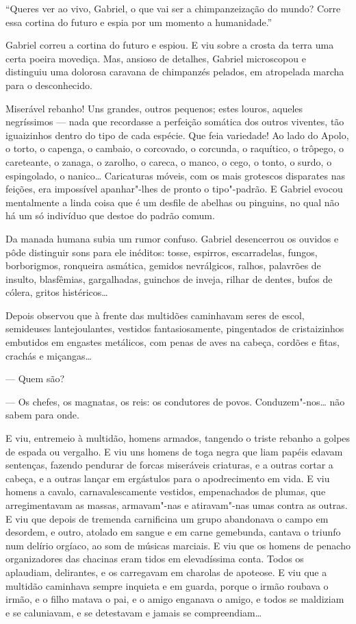 ``Queres ver ao vivo, Gabriel, o que vai ser a chimpanzeização do mundo?
Corre essa cortina do futuro e espia por um momento a humanidade.''

Gabriel correu a cortina do futuro e espiou. E viu sobre a crosta da
terra uma certa poeira movediça. Mas, ansioso de detalhes, Gabriel
microscopou e distinguiu uma dolorosa caravana de chimpanzés pelados, em
atropelada marcha para o desconhecido.

Miserável rebanho! Uns grandes, outros pequenos; estes louros, aqueles
negríssimos --- nada que recordasse a perfeição somática dos outros
viventes, tão iguaizinhos dentro do tipo de cada espécie. Que feia
variedade! Ao lado do Apolo, o torto, o capenga, o cambaio, o corcovado,
o corcunda, o raquítico, o trôpego, o careteante, o zanaga, o zarolho, o
careca, o manco, o cego, o tonto, o surdo, o espingolado, o nanico\ldots{}
Caricaturas móveis, com os mais grotescos disparates nas feições, era
impossível apanhar"-lhes de pronto o tipo"-padrão. E Gabriel evocou
mentalmente a linda coisa que é um desfile de abelhas ou pinguins, no
qual não há um só indivíduo que destoe do padrão comum.

Da manada humana subia um rumor confuso. Gabriel desencerrou os ouvidos
e pôde distinguir sons para ele inéditos: tosse, espirros, escarradelas,
fungos, borborigmos, ronqueira asmática, gemidos nevrálgicos, ralhos,
palavrões de insulto, blasfêmias, gargalhadas, guinchos de inveja,
rilhar de dentes, bufos de cólera, gritos histéricos\ldots{}

Depois observou que à frente das multidões caminhavam seres de escol,
semideuses lantejoulantes, vestidos fantasiosamente, pingentados de
cristaizinhos embutidos em engastes metálicos, com penas de aves na
cabeça, cordões e fitas, crachás e miçangas\ldots{}

--- Quem são?

--- Os chefes, os magnatas, os reis: os condutores de povos.
Conduzem"-nos\ldots{} não sabem para onde.

E viu, entremeio à multidão, homens armados, tangendo o triste rebanho a
golpes de espada ou vergalho. E viu uns homens de toga negra que liam
papéis edavam sentenças, fazendo pendurar de forcas miseráveis
criaturas, e a outras cortar a cabeça, e a outras lançar em ergástulos
para o apodrecimento em vida. E viu homens a cavalo, carnavalescamente
vestidos, empenachados de plumas, que arregimentavam as massas,
armavam"-nas e atiravam"-nas umas contra as outras. E viu que depois de
tremenda carnificina um grupo abandonava o campo em desordem, e outro,
atolado em sangue e em carne gemebunda, cantava o triunfo num delírio
orgíaco, ao som de músicas marciais. E viu que os homens de penacho
organizadores das chacinas eram tidos em elevadíssima conta. Todos os
aplaudiam, delirantes, e os carregavam em charolas de apoteose. E viu
que a multidão caminhava sempre inquieta e em guarda, porque o irmão
roubava o irmão, e o filho matava o pai, e o amigo enganava o amigo, e
todos se maldiziam e se caluniavam, e se detestavam e jamais se
compreendiam\ldots{}

